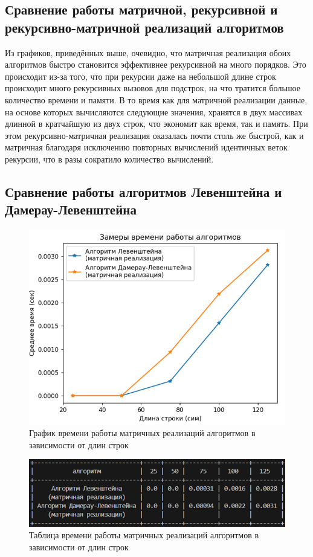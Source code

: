 \documentclass[a4paper,12pt]{article}
\begin{document}
\subsection{Сравнение работы матричной, рекурсивной и рекурсивно-матричной реализаций алгоритмов}
Из графиков, приведённых выше, очевидно, что матричная реализация обоих алгоритмов быстро становится эффективнее рекурсивной на много порядков. Это происходит из-за того, что при рекурсии даже на небольшой длине строк происходит много рекурсивных вызовов для подстрок, на что тратится большое количество времени и памяти. В то время как для матричной реализации данные, на основе которых вычисляются следующие значения, хранятся в двух массивах длинной в кратчайшую из двух строк, что экономит как время, так и память. При этом рекурсивно-матричная реализация оказалась почти столь же быстрой, как и матричная благодаря исключению повторных вычислений идентичных веток рекурсии, что в разы сократило количество вычислений.
\subsection{Сравнение работы алгоритмов Левенштейна и Дамерау-Левенштейна}
\begin{figure}[H]
    \centering
    \includegraphics[width=1\textwidth]{graph_mat.png}
    \caption{График времени работы матричных реализаций алгоритмов в зависимости от длин строк}
\end{figure}
\begin{figure}[H]
    \centering
    \includegraphics[width=1\textwidth]{table_mat.png}
    \caption{Таблица времени работы матричных реализаций алгоритмов в зависимости от длин строк}
\end{figure}
\end{document}
